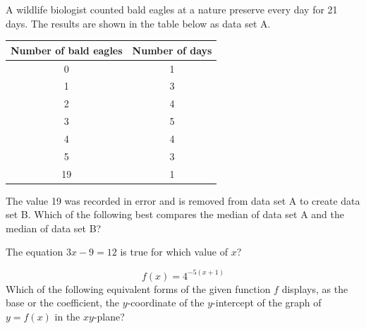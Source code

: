 
\vspace{2em}
\noindent\markforreview
\vspace{1em}

A wildlife biologist counted bald eagles at a nature preserve every day for 21 days. The results are shown in the table below as data set A.

\begin{center}
\begin{tabular}{|c|c|}
\hline
\textbf{Number of bald eagles} & \textbf{Number of days}\\
\hline
0 & 1\\
1 & 3\\
2 & 4\\
3 & 5\\
4 & 4\\
5 & 3\\
19 & 1\\
\hline
\end{tabular}
\end{center}

The value 19 was recorded in error and is removed from data set A to create data set B. Which of the following best compares the median of data set A and the median of data set B?

\vspace{0.75em}


\newpage
\noindent\markforreview
\vspace{1em}

The equation \(3x - 9 = 12\) is true for which value of \(x\)?

\vspace{0.75em}


\vspace{2em}
\noindent\markforreview
\vspace{1em}

\[
f(x)=4^{-5(x+1)}
\]
Which of the following equivalent forms of the given function \(f\) displays, as the base or the coefficient, the \(y\)-coordinate of the \(y\)-intercept of the graph of \(y=f(x)\) in the \(xy\)-plane?

